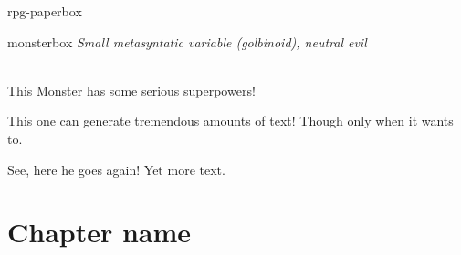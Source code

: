 \documentclass[10pt,twoside,twocolumn]{book}
\begin{document}
\begin{rpg-paperbox}{rpg-paperbox}
	\lipsum[1]
\end{rpg-paperbox}

\begin{rpgmonsterbox}{monsterbox}
	\textit{Small metasyntatic variable (golbinoid), neutral evil}\\
	\hline
	\basics[%
	armorclass = 12,
	hitpoints  = 16 (3d8 + 3),
	speed      = 50 ft
	]
	\hline
	\stats[
    STR = \stat{12}, %
    DEX = \stat{7}
	]
	\hline
	\details[%
	languages = {Common Lisp, Erlang},
	]
	\hline \\[1mm]
	\begin{rpgmonsteraction}
		This Monster has some serious superpowers!
	\end{rpgmonsteraction}
	\begin{rpgmonsteraction}
		This one can generate tremendous amounts of text! Though only when it wants to.
	\end{rpgmonsteraction}

	\begin{rpgmonsteraction}
    See, here he goes again! Yet more text.
	\end{rpgmonsteraction}
\end{rpgmonsterbox}

\chapter{Chapter name}

\end{document}
